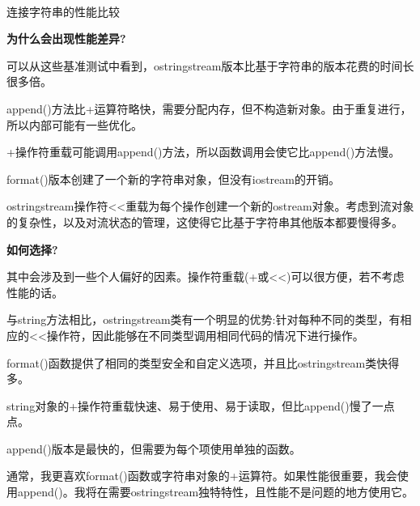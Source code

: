 \begin{itemize}
\begin{table}[H]
\hspace*{\fill} \\ %
连接字符串的性能比较
\end{table}

\end{itemize}

\noindent
\textbf{为什么会出现性能差异?}

可以从这些基准测试中看到，ostringstream版本比基于字符串的版本花费的时间长很多倍。

append()方法比+运算符略快，需要分配内存，但不构造新对象。由于重复进行，所以内部可能有一些优化。

+操作符重载可能调用append()方法，所以函数调用会使它比append()方法慢。

format()版本创建了一个新的字符串对象，但没有iostream的开销。

ostringstream操作符<{}<重载为每个操作创建一个新的ostream对象。考虑到流对象的复杂性，以及对流状态的管理，这使得它比基于字符串其他版本都要慢得多。

\noindent
\textbf{如何选择?}

其中会涉及到一些个人偏好的因素。操作符重载(+或<{}<)可以很方便，若不考虑性能的话。

与string方法相比，ostringstream类有一个明显的优势:针对每种不同的类型，有相应的<{}<操作符，因此能够在不同类型调用相同代码的情况下进行操作。

format()函数提供了相同的类型安全和自定义选项，并且比ostringstream类快得多。

string对象的+操作符重载快速、易于使用、易于读取，但比append()慢了一点点。

append()版本是最快的，但需要为每个项使用单独的函数。

通常，我更喜欢format()函数或字符串对象的+运算符。如果性能很重要，我会使用append()。我将在需要ostringstream独特特性，且性能不是问题的地方使用它。